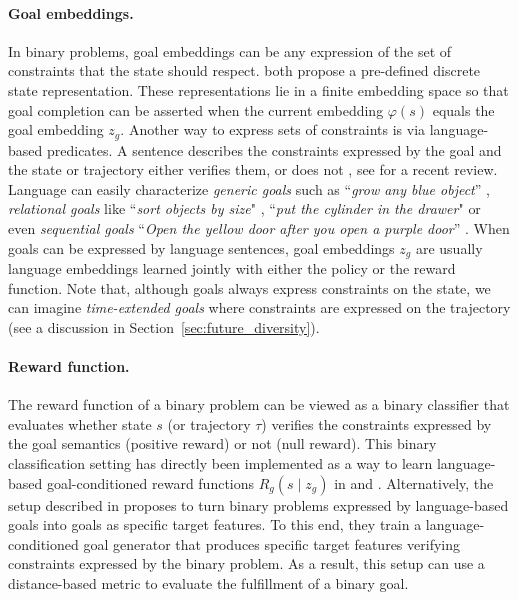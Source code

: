 \paragraph{Goal embeddings.} In binary problems, goal embeddings can be any expression of the set of constraints
that the state should respect. \cite{akakzia2020decstr,ecoffet2020first} both propose a pre-defined discrete state representation. These representations lie in a finite embedding space so that goal completion can be asserted when the current embedding $\varphi(s)$ equals the goal embedding $z_g$. Another way to express sets of constraints is via language-based predicates. A sentence describes the constraints expressed by the goal and the state or trajectory
either verifies them, or does not \cite{Hermann2017,chan2019actrce,Jiang2019,bahdanau2018learning,bahdanau2018systematic,hill2019emergent,ther,imagine,lynch2020grounding}, see \cite{Luketina2019} for a recent review. Language can easily characterize \textit{generic goals} such as ``\textit{grow any blue object}'' \cite{imagine}, \textit{relational goals} like ``\textit{sort objects by size}" \cite{Jiang2019}, ``\textit{put the cylinder in the drawer}" \cite{lynch2020grounding} or even \textit{sequential goals} ``\textit{Open the yellow door after you open a purple door}'' \cite{chevalier-boisvert2018babyai}. When goals can be expressed by language sentences, goal embeddings $z_g$ are usually language embeddings learned jointly with either the policy or the reward function. Note that, although \rl goals always express constraints on the state, we can imagine \textit{time-extended goals} where constraints are expressed on the trajectory (see a discussion in Section~\ref{sec:future_diversity}).

\paragraph{Reward function.} The reward function of a binary problem can be viewed as a binary classifier that evaluates whether state $s$ (or trajectory $\tau$) verifies the constraints expressed by the goal semantics (positive reward) or not (null reward). This binary classification setting has directly been implemented as a way to learn language-based goal-conditioned reward functions $R_g(s\mid z_g)$ in \cite{bahdanau2018learning} and \cite{imagine}. Alternatively, the setup described in \cite{colas2020language} proposes to turn binary problems expressed by language-based goals into goals as specific target features. To this end, they train a language-conditioned goal generator that produces specific target features verifying constraints expressed by the binary problem. As a result, this setup can use a distance-based metric to evaluate the fulfillment of a binary goal.

